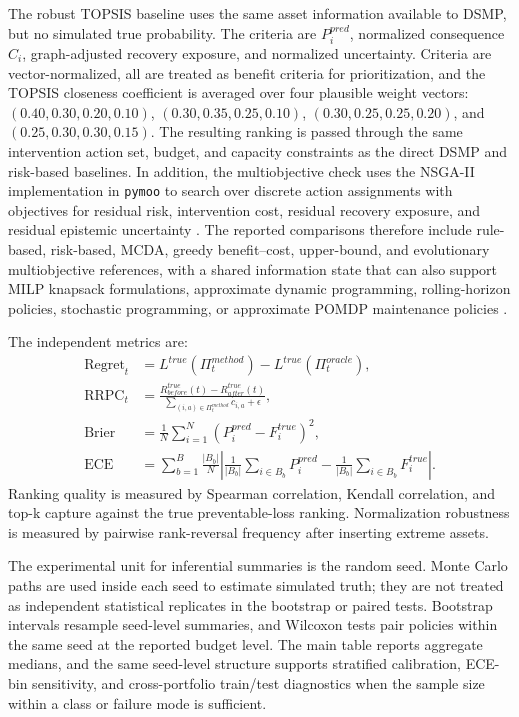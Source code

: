\documentclass[cmes,article,submit,moreauthors,pdftex]{Definitions/tsp}
\begin{document}
The robust TOPSIS baseline uses the same asset information available to DSMP, but no simulated true probability. The criteria are $P_i^{pred}$, normalized consequence $C_i$, graph-adjusted recovery exposure, and normalized uncertainty. Criteria are vector-normalized, all are treated as benefit criteria for prioritization, and the TOPSIS closeness coefficient is averaged over four plausible weight vectors: $(0.40,0.30,0.20,0.10)$, $(0.30,0.35,0.25,0.10)$, $(0.30,0.25,0.25,0.20)$, and $(0.25,0.30,0.30,0.15)$. The resulting ranking is passed through the same intervention action set, budget, and capacity constraints as the direct DSMP and risk-based baselines. In addition, the multiobjective check uses the NSGA-II implementation in \texttt{pymoo} to search over discrete action assignments with objectives for residual risk, intervention cost, residual recovery exposure, and residual epistemic uncertainty \cite{deb2002,blank2020pymoo}. The reported comparisons therefore include rule-based, risk-based, MCDA, greedy benefit--cost, upper-bound, and evolutionary multiobjective references, with a shared information state that can also support MILP knapsack formulations, approximate dynamic programming, rolling-horizon policies, stochastic programming, or approximate POMDP maintenance policies \cite{debjain2014,zhangli2007,coello2004}.

The independent metrics are:
\begin{align}
\mathrm{Regret}_t &=
L^{true}(\Pi_t^{method})-L^{true}(\Pi_t^{oracle}),\\
\mathrm{RRPC}_t &=
\frac{R^{true}_{before}(t)-R^{true}_{after}(t)}
{\sum_{(i,a)\in\Pi_t^{method}}c_{i,a}+\epsilon},\\
\mathrm{Brier} &=
\frac{1}{N}\sum_{i=1}^{N}(P_i^{pred}-F_i^{true})^2,\\
\mathrm{ECE} &=
\sum_{b=1}^{B}\frac{|B_b|}{N}
\left|
\frac{1}{|B_b|}\sum_{i\in B_b}P_i^{pred}
-
\frac{1}{|B_b|}\sum_{i\in B_b}F_i^{true}
\right|.
\end{align}
Ranking quality is measured by Spearman correlation, Kendall correlation, and top-k capture against the true preventable-loss ranking. Normalization robustness is measured by pairwise rank-reversal frequency after inserting extreme assets.

The experimental unit for inferential summaries is the random seed. Monte Carlo paths are used inside each seed to estimate simulated truth; they are not treated as independent statistical replicates in the bootstrap or paired tests. Bootstrap intervals resample seed-level summaries, and Wilcoxon tests pair policies within the same seed at the reported budget level. The main table reports aggregate medians, and the same seed-level structure supports stratified calibration, ECE-bin sensitivity, and cross-portfolio train/test diagnostics when the sample size within a class or failure mode is sufficient.
\end{document}
